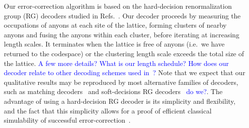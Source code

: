 \documentclass[aps, prl, letterpaper, twocolumn, superscriptaddress, notitlepage, 10pt]{revtex4-1}
\newcommand{\cggb}[1]{\textcolor{blue}{#1}}
\begin{document}
Our error-correction algorithm is based on the hard-decision renormalization group (RG) 
decoders studied in Refs.~\cite{?}. Our decoder proceeds by measuring the occupations of 
anyons at each site of the lattice, forming clusters of nearby anyons and fusing the anyons 
within each cluster, before iterating at increasing length scales. It terminates when the lattice 
is free of anyons (i.e.~we have returned to the codespace) or the clustering length scale 
exceeds the total size of the lattice. \cggb{A few more details? What is our length schedule?} 
\cggb{How does our decoder relate to other decoding schemes used in~\cite{Wootton2013,Brell2013,Hutter2014}?} 
Note that we expect that our qualitative results may be reproduced by most alternative 
families of decoders, such as matching decoders~\cite{?} and soft-decisions 
RG decoders~\cite{?} \cggb{do we?}. The advantage of using a hard-decision RG decoder is 
its simplicity and flexibility, and the fact that this simplicity allows for a proof of efficient 
classical simulability of successful error-correction~\cite{RGsim}.
\end{document}
